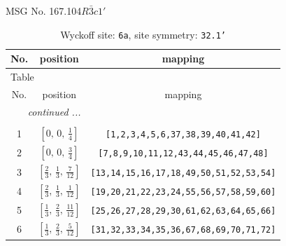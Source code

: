 \documentclass[fleqn,8pt]{jsarticle}
\begin{document}
\setcounter{MaxMatrixCols}{32}

\renewcommand{\tablename}{Table~}
\renewcommand{\figurename}{Figure~}
\begin{center}
\LARGE
MSG No. 167.104\quad$R\bar{3}c1'$
\end{center}
\renewcommand{\arraystretch}{1.2}
\begin{longtable}{ccc}
\caption{Wyckoff site: {\tt 6a}, site symmetry: {\tt 32.1'}}
 \\
 \hline \hline
No. & position & mapping \\ \hline \endfirsthead

\multicolumn{2}{l}{\tablename\ \thetable{}} \\
 \hline \hline
No. & position & mapping \\ \hline \endhead

 \hline \hline
\multicolumn{2}{r}{\footnotesize\it continued ...} \\ \endfoot

 \hline \hline
\multicolumn{2}{r}{} \\ \endlastfoot

1 & $\left[ 0,\, 0,\, \frac{1}{4} \right]$ & {\tt [1,2,3,4,5,6,37,38,39,40,41,42]} \\ \hline
2 & $\left[ 0,\, 0,\, \frac{3}{4} \right]$ & {\tt [7,8,9,10,11,12,43,44,45,46,47,48]} \\ \hline
3 & $\left[ \frac{2}{3},\, \frac{1}{3},\, \frac{7}{12} \right]$ & {\tt [13,14,15,16,17,18,49,50,51,52,53,54]} \\ \hline
4 & $\left[ \frac{2}{3},\, \frac{1}{3},\, \frac{1}{12} \right]$ & {\tt [19,20,21,22,23,24,55,56,57,58,59,60]} \\ \hline
5 & $\left[ \frac{1}{3},\, \frac{2}{3},\, \frac{11}{12} \right]$ & {\tt [25,26,27,28,29,30,61,62,63,64,65,66]} \\ \hline
6 & $\left[ \frac{1}{3},\, \frac{2}{3},\, \frac{5}{12} \right]$ & {\tt [31,32,33,34,35,36,67,68,69,70,71,72]} \\
\end{longtable}
\renewcommand{\arraystretch}{1.2}
\end{document}
